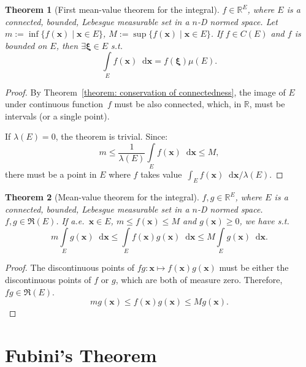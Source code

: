 \documentclass[openany]{book}
\theoremstyle{plain}
\newtheorem{theorem}{Theorem}[section] %
\theoremstyle{definition}
\newcommand{\dif}{\mathop{}\!\mathrm{d}} %
\newcommand*{\bv}{\boldsymbol} %
\begin{document}
\begin{theorem}[First mean-value theorem for the integral]
	\label{theorem: first mean-value theorem for the integral}
	$f \in \mathbb R^E$, where $E$ is a connected, bounded, Lebesgue measurable set in a $n$-D normed space. 
	Let $m := \inf\{f(\bv x) \mid \bv x \in E\}$, $M := \sup\{f(\bv x) \mid \bv x \in E\}$.
	If $f \in C(E)$ and $f$ is bounded on $E$, then $\exists \bv \xi \in E$ s.t.\ 
	\begin{equation*}
		\int\limits_E f(\bv x) \dif \bv x = f(\bv \xi) \mu(E).
	\end{equation*}
\end{theorem}
\begin{proof}
	By Theorem~\ref{theorem: conservation of connectedness}, the image of $E$ under continuous function~$f$ must be also connected, which, in $\mathbb R$, must be intervals (or a single point).

	If $\lambda(E) = 0$, the theorem is trivial. 
	Since:
	\begin{equation*}
		m \leq \frac{1}{\lambda (E)} \int\limits_E f(\bv x) \dif \bv x \leq M, 
	\end{equation*}
	there must be a point in $E$ where $f$ takes value~$\int_E f(\bv x) \dif \bv x / \lambda(E)$.
\end{proof}

\begin{theorem}[Mean-value theorem for the integral]
	\label{theorem : mean-value theorem for the integral}
	$f, g \in \mathbb R^E$, where $E$ is a connected, bounded, Lebesgue measurable set in a $n$-D normed space. 
	$f, g \in \mathfrak R(E)$. 
	If a.e.\ $\bv x \in E$, $m \leq f(\bv x) \leq M$ and $g(\bv x) \geq 0$, we have
	s.t.\ 
	\begin{equation*}
		m \int\limits_E g(\bv x) \dif \bv x 
			\leq \int\limits_E f(\bv x) g(\bv x)\dif \bv x 
			\leq M \int\limits_E g(\bv x) \dif \bv x.
	\end{equation*}
\end{theorem}
\begin{proof}
	The discontinuous points of $fg \colon \bv x \mapsto f(\bv x)g(\bv x)$ must be either the discontinuous points of $f$ or $g$, which are both of measure zero. Therefore, $fg \in \mathfrak R(E)$.
	\begin{equation*}
		m g(\bv x) \leq f(\bv x) g(\bv x) \leq M g(\bv x).
	\end{equation*}
\end{proof}

\section{Fubini's Theorem}
\end{document}
